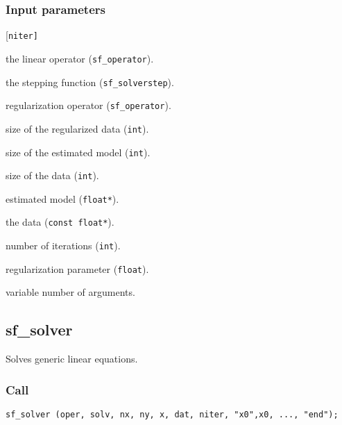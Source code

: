 \subsubsection*{Input parameters}
\begin{desclist}{\tt }{\quad}[\tt niter]
   \setlength\itemsep{0pt}
   \item[oper]  the linear operator (\texttt{sf\_operator}).
   \item[solv]  the stepping function (\texttt{sf\_solverstep}).  
   \item[prec]  regularization operator (\texttt{sf\_operator}).   
   \item[nreg]  size of the regularized data (\texttt{int}).  
   \item[nx]    size of the estimated model  (\texttt{int}).  
   \item[ny]    size of the data  (\texttt{int}).  
   \item[x]     estimated model  (\texttt{float*}).  
   \item[dat]   the data (\texttt{const float*}).  
   \item[niter] number of iterations (\texttt{int}).  
   \item[eps]   regularization parameter (\texttt{float}).  
   \item[...]   variable number of arguments.
\end{desclist}




\subsection{{sf\_solver}}
Solves generic linear equations.


\subsubsection*{Call}
\begin{verbatim}
sf_solver (oper, solv, nx, ny, x, dat, niter, "x0",x0, ..., "end");
\end{verbatim}

